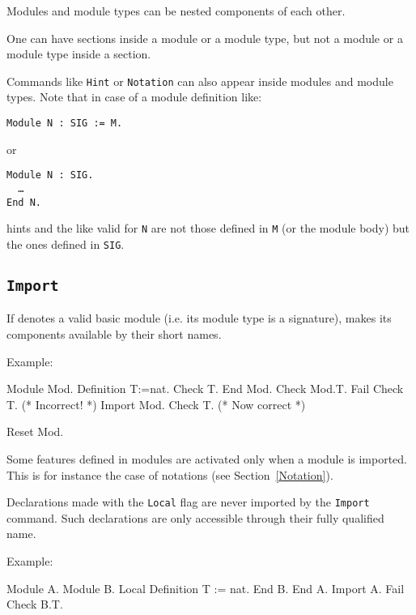\begin{Remarks}
\item Modules and module types can be nested components of each other.
\item One can have sections inside a module or a module type, but
  not a module or a module type inside a section.
\item Commands like \texttt{Hint} or \texttt{Notation} can
  also appear inside modules and module types. Note that in case of a
  module definition like:

    \smallskip
    \noindent
    {\tt Module N : SIG := M.} 
    \smallskip

    or

    \smallskip
    {\tt Module N : SIG.\\
      \ \ \dots\\
      End N.}
    \smallskip 
    
    hints and the like valid for \texttt{N} are not those defined in
    \texttt{M} (or the module body) but the ones defined in
    \texttt{SIG}.

\end{Remarks}

\subsection{\tt Import {\qualid}
\label{Import}}

If {\qualid} denotes a valid basic module (i.e. its module type is a
signature), makes its components available by their short names.

Example:

\begin{coq_example}
Module Mod.
  Definition T:=nat.
  Check T.
End Mod.
Check Mod.T.
Fail Check T. (* Incorrect! *)
Import Mod.
Check T. (* Now correct *)
\end{coq_example}
\begin{coq_eval}
Reset Mod.
\end{coq_eval}

Some features defined in modules are activated only when a module is
imported. This is for instance the case of notations (see
Section~\ref{Notation}).

Declarations made with the {\tt Local} flag are never imported by the
{\tt Import} command. Such declarations are only accessible through their
fully qualified name.

Example:

\begin{coq_example}
Module A.
Module B.
Local Definition T := nat.
End B.
End A.
Import A.
Fail Check B.T.
\end{coq_example}

